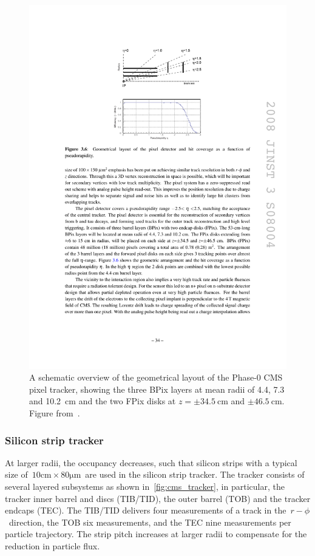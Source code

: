 \begin{figure}
\begin{centering}
\includegraphics[width=1.0\textwidth]{figures/exp/pixel.pdf}
\caption[The CMS pixel tracker]{A schematic overview of the geometrical layout of the Phase-0 CMS pixel tracker, showing the three BPix layers at mean radii of 4.4, 7.3 and 10.2~cm and the two FPix disks at $z=\pm 34.5~\mathrm{cm}$ and $\pm 46.5~\mathrm{cm}$. Figure from~\cite{Chatrchyan:2008aa}.}
\label{fig:cms_pixel}
\end{centering}
\end{figure}

\subsubsection{Silicon strip tracker}
At larger radii, the occupancy decreases, such that silicon strips with a typical size of~$10\mathrm{cm} \times 80\mathrm{\mu m}$~are used in the silicon strip tracker. The tracker consists of several layered subsystems as shown in~\cref{fig:cms_tracker}, in particular, the tracker inner barrel and discs (TIB/TID), the outer barrel (TOB) and the tracker endcaps (TEC). The TIB/TID delivers four measurements of a track in the~$r-\phi$~direction, the TOB six measurements, and the TEC nine measurements per particle trajectory. The strip pitch increases at larger radii to compensate for the reduction in particle flux.


